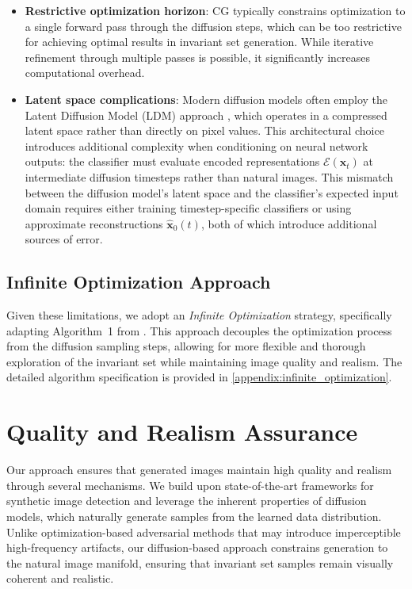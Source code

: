 \documentclass[licencjacka,en]{pracamgr}
\begin{document}
\begin{itemize}
  \item \textbf{Restrictive optimization horizon}: CG typically constrains optimization to a single forward pass through the diffusion steps, which can be too restrictive for achieving optimal results in invariant set generation. While iterative refinement through multiple passes is possible, it significantly increases computational overhead.
  
  \item \textbf{Latent space complications}: Modern diffusion models often employ the Latent Diffusion Model (LDM) approach \cite{rombach2022highresolutionimagesynthesislatent}, which operates in a compressed latent space rather than directly on pixel values. This architectural choice introduces additional complexity when conditioning on neural network outputs: the classifier must evaluate encoded representations $\mathcal{E}(\mathbf{x}_t)$ at intermediate diffusion timesteps rather than natural images. This mismatch between the diffusion model's latent space and the classifier's expected input domain requires either training timestep-specific classifiers or using approximate reconstructions $\hat{\mathbf{x}}_0(t)$, both of which introduce additional sources of error.
\end{itemize}

\subsection{Infinite Optimization Approach}

Given these limitations, we adopt an \textit{Infinite Optimization} strategy, specifically adapting Algorithm~1 from \cite{augustin2024digindiffusionguidanceinvestigating}. This approach decouples the optimization process from the diffusion sampling steps, allowing for more flexible and thorough exploration of the invariant set while maintaining image quality and realism. The detailed algorithm specification is provided in \cref{appendix:infinite_optimization}.

\section{Quality and Realism Assurance}\label{method:quality_realism}

Our approach ensures that generated images maintain high quality and realism through several mechanisms. We build upon state-of-the-art frameworks for synthetic image detection and leverage the inherent properties of diffusion models, which naturally generate samples from the learned data distribution. Unlike optimization-based adversarial methods that may introduce imperceptible high-frequency artifacts, our diffusion-based approach constrains generation to the natural image manifold, ensuring that invariant set samples remain visually coherent and realistic.
\end{document}
